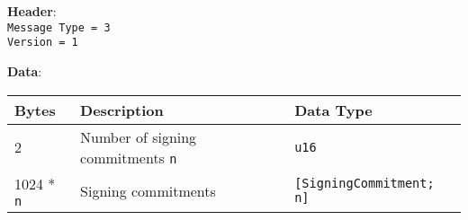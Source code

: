 \documentclass[11pt]{article}
\begin{document}
\textbf{Header}:\\
\texttt{Message Type = 3}\\
\texttt{Version = 1}

\textbf{Data}:
\begin{center}
\begin{tabular}{lll}
Bytes & Description & Data Type\\
\hline
2 & Number of signing commitments \texttt{n} & \texttt{u16}\\
1024 * \texttt{n} & Signing commitments & \texttt{[SigningCommitment; n]}\\
\end{tabular}
\end{center}
\end{document}
